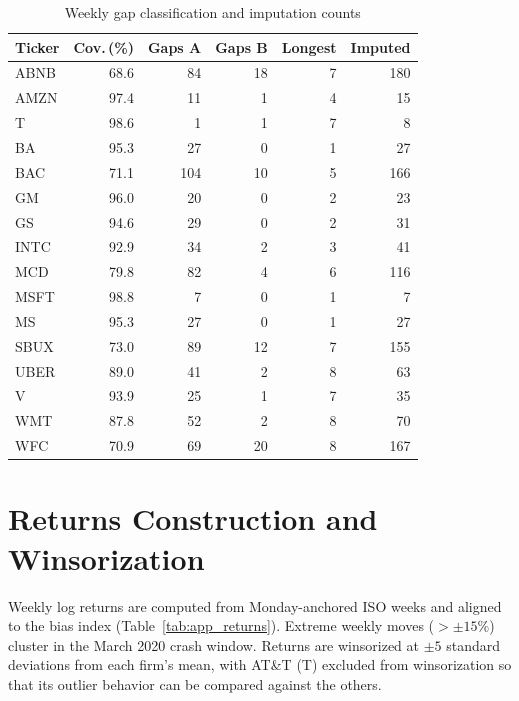 \documentclass[conference]{IEEEtran}
\begin{document}
\begin{table}[!t]
\caption{Weekly gap classification and imputation counts}
\label{tab:app_gaps}
\centering
\small
\begin{tabular}{lrrrrr}
\toprule
Ticker & Cov.\,(\%) & Gaps A & Gaps B & Longest & Imputed \\
\midrule
ABNB & 68.6 & 84  & 18 & 7 & 180 \\
AMZN & 97.4 & 11  & 1  & 4 & 15 \\
T    & 98.6 & 1   & 1  & 7 & 8 \\
BA   & 95.3 & 27  & 0  & 1 & 27 \\
BAC  & 71.1 & 104 & 10 & 5 & 166 \\
GM   & 96.0 & 20  & 0  & 2 & 23 \\
GS   & 94.6 & 29  & 0  & 2 & 31 \\
INTC & 92.9 & 34  & 2  & 3 & 41 \\
MCD  & 79.8 & 82  & 4  & 6 & 116 \\
MSFT & 98.8 & 7   & 0  & 1 & 7 \\
MS   & 95.3 & 27  & 0  & 1 & 27 \\
SBUX & 73.0 & 89  & 12 & 7 & 155 \\
UBER & 89.0 & 41  & 2  & 8 & 63 \\
V    & 93.9 & 25  & 1  & 7 & 35 \\
WMT  & 87.8 & 52  & 2  & 8 & 70 \\
WFC  & 70.9 & 69  & 20 & 8 & 167 \\
\bottomrule
\end{tabular}
\end{table}

\section{Returns Construction and Winsorization}
\label{app:returns}
Weekly log returns are computed from Monday-anchored ISO weeks and aligned to the
bias index (Table~\ref{tab:app_returns}). Extreme weekly moves ($>\pm15\%$)
cluster in the March 2020 crash window. Returns are winsorized at $\pm5$ standard
deviations from each firm's mean, with AT\&T (T) excluded from winsorization so
that its outlier behavior can be compared against the others.
\end{document}
